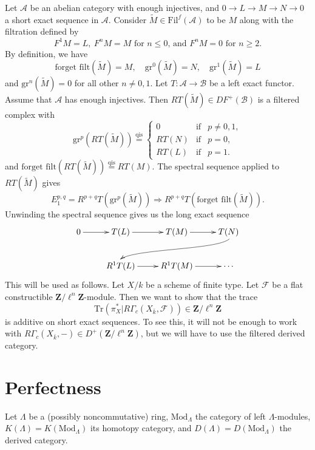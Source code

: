 Let $\mathcal{A}$ be an abelian category with enough injectives, and $0 \to L 
\to M \to N \to 0$ a short exact sequence in $\mathcal{A}$. Consider 
$\widetilde M \in \text{Fil}^f(\mathcal{A})$ to be $M$ along with the 
filtration defined by 
$$
F^1M = L, \ F^nM = M
\text{ for $n \leq 0$, and $F^nM = 0$ for $n \geq 2$.} 
$$
By definition, we have
$$
\text{forget filt}(\widetilde M) = M, \quad
\text{gr}^0(\widetilde M) = N, \quad
\text{gr}^1(\widetilde M) = L 
$$
and $\text{gr}^n(\widetilde M) = 0$ for all other $n \neq 0,1$. Let $T: 
\mathcal{A} \to \mathcal{B}$ be a left exact functor. Assume that $\mathcal{A}$ 
has enough injectives.  Then $RT(\widetilde M) \in D F^+(\mathcal{B})$ is a 
filtered complex with 
$$
\text{gr}^p(RT(\widetilde M)) \stackrel {\mathrm{qis}}{=} \left \{
\begin{matrix}
0 & \text{if} & p \neq 0,1, \\
RT(N) & \text{if} & p = 0, \\
RT(L) & \text{if} & p = 1.
\end{matrix}
\right . 
$$
and $\text{forget filt}(RT(\widetilde M))\stackrel{\text{qis}}{ = } RT(M)$. The 
spectral sequence applied to $RT(\widetilde M)$ gives
$$
E_1^{p,q} = R^{p+q}T(\mathrm{gr}^p(\widetilde M)) \Rightarrow 
R^{p+q}T(\text{forget filt}(\widetilde M)).
$$
Unwinding the spectral sequence gives us the long exact sequence
$$
\xymatrix{
  0 \ar[r] & T(L) \ar[r] & T(M) \ar[r] & T(N) \ar@(rd,ul)[rdllllr] \\
& R^1T(L) \ar[r] & R^1T(M) \ar[r] & \cdots
}
$$
This will be used as follows. Let $X/k$ be a scheme of finite type.  Let 
$\mathcal{F}$ be a flat constructible $\mathbf{Z}/\ell^n \mathbf{Z}$-module.  
Then we want to show that the trace 
$$
\text{Tr}( \pi_X^\ast | R\Gamma_c(X_{\bar k}, \mathcal{F})) \in 
\mathbf{Z}/\ell^n \mathbf{Z}
$$
is additive on short exact sequences. To see this, it will not be enough to 
work with $R\Gamma_c(X_{\bar k}, -) \in D^+(\mathbf{Z}/\ell^n \mathbf{Z})$, but 
we will have to use the filtered derived category.

\section{Perfectness}

Let $\Lambda$ be a (possibly noncommutative) ring, $\text{Mod}_{\Lambda}$ the 
category of left $\Lambda$-modules, $K(\Lambda) = K(\text{Mod}_\Lambda)$ its 
homotopy category, and $D(\Lambda)= D(\text{Mod}_\Lambda)$ the derived 
category. 

